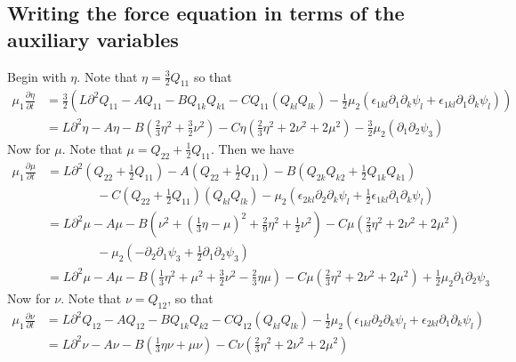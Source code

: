 \documentclass[reqno]{article}
\begin{document}
	\subsection{Writing the force equation in terms of the auxiliary variables} \label{sec:force-aux}
	Begin with $\eta$. Note that $\eta = \frac{3}{2}Q_{11}$ so that
	\begin{equation} \label{eq:etaeq}
	\begin{split}
		\mu_1 \frac{\partial \eta}{\partial t} &= \frac{3}{2}\left( L\partial^2 Q_{11} - A Q_{11} - B Q_{1k}Q_{k1} - C Q_{11}\left( Q_{kl}Q_{lk} \right) - \frac{1}{2}\mu_2 \left( \epsilon_{1kl}\partial_1\partial_k \psi_l + \epsilon_{1kl}\partial_1 \partial_k \psi_l \right) \right) \\
		&= L\partial^2 \eta - A\eta - B\left( \frac{2}{3}\eta^2 + \frac{3}{2}\nu^2 \right) - C\eta\left( \frac{2}{3}\eta^2 + 2\nu^2 + 2\mu^2 \right) - \frac{3}{2}\mu_2\left( \partial_1\partial_2 \psi_3 \right)
	\end{split}
	\end{equation}
	Now for $\mu$. Note that $\mu = Q_{22} + \frac{1}{2} Q_{11}$. Then we have
	\begin{equation} \label{eq:mueq}
	\begin{split}
		\mu_1 \frac{\partial \mu}{\partial t} &= L \partial^2 \left( Q_{22} + \frac{1}{2}Q_{11} \right) - A\left(Q_{22} + \frac{1}{2} Q_{11}\right) - B\left( Q_{2k}Q_{k2} + \frac{1}{2}Q_{1k}Q_{k1} \right) \\
		&\qquad\qquad - C\left( Q_{22} + \frac{1}{2} Q_{11}\right)\left( Q_{kl}Q_{lk} \right) - \mu_2\left( \epsilon_{2kl}\partial_2\partial_k \psi_l + \frac{1}{2}\epsilon_{1kl}\partial_1\partial_k\psi_l \right) \\
		&= L\partial^2\mu - A\mu - B\left( \nu^2 + \left( \frac{1}{3}\eta - \mu \right)^2 + \frac{2}{9}\eta^2 + \frac{1}{2}\nu^2 \right) - C\mu\left( \frac{2}{3}\eta^2 + 2\nu^2 + 2\mu^2 \right) \\
		&\qquad\qquad - \mu_2\left( -\partial_2\partial_1\psi_3 + \frac{1}{2}\partial_1\partial_2\psi_3 \right) \\
		&= L\partial^2\mu - A\mu - B\left( \frac{1}{3}\eta^2 + \mu^2 + \frac{3}{2}\nu^2 - \frac{2}{3}\eta\mu \right) - C\mu\left( \frac{2}{3}\eta^2 + 2\nu^2 + 2\mu^2 \right) + \frac{1}{2}\mu_2\partial_1\partial_2 \psi_3
	\end{split}
	\end{equation}
	Now for $\nu$. Note that $\nu = Q_{12}$, so that
	\begin{equation}\label{eq:nueq}
	\begin{split}
		\mu_1 \frac{\partial \nu}{\partial t} &= L\partial^2 Q_{12} - A Q_{12} - B Q_{1k}Q_{k2} - C Q_{12}\left( Q_{kl}Q_{lk} \right) - \frac{1}{2}\mu_2 \left( \epsilon_{1kl}\partial_2\partial_k \psi_l + \epsilon_{2kl}\partial_1 \partial_k \psi_l \right) \\
		&= L\partial^2\nu - A\nu - B\left( \frac{1}{3}\eta\nu + \mu\nu \right) - C\nu\left( \frac{2}{3}\eta^2 + 2\nu^2 + 2\mu^2 \right)
	\end{split}
	\end{equation}
	
\end{document}
